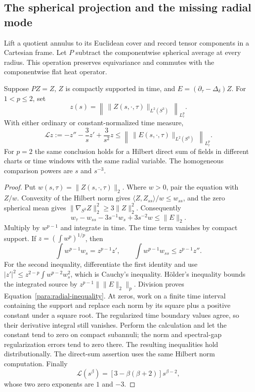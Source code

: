 \subsection{The spherical projection and the missing radial mode}
\label{para:radial-subsection}

Lift a quotient annulus to its Euclidean cover and record tensor
components in a Cartesian frame.  Let $P$ subtract the componentwise
spherical average at every radius.  This operation preserves
equivariance and commutes with the componentwise flat heat operator.

\begin{lemma}
\label{para:radial-lemma}
Suppose $PZ=Z$, $Z$ is compactly supported in time, and
$E=(\partial_\tau-\Delta_\delta)Z$.  For $1<p\le2$, set
\[
 z(s)=\left\|\,\|Z(s,\cdot,\tau)\|_{L^2(S^3)}\,\right\|_{L^p_\tau}.
\]
With either ordinary or constant-normalized time measure,
\begin{equation}
 \mathcal Lz:=-z''-\frac3s z'+\frac3{s^2}z
 \le\left\|\,\|E(s,\cdot,\tau)\|_{L^2(S^3)}\,\right\|_{L^p_\tau}.
 \label{para:radial-inequality}
\end{equation}
For $p=2$ the same conclusion holds for a Hilbert direct sum of fields
in different charts or time windows with the same radial variable.
The homogeneous comparison powers are $s$ and $s^{-3}$.
\end{lemma}

\begin{proof}
Put $w(s,\tau)=\|Z(s,\cdot,\tau)\|_2$.  Where $w>0$, pair the
equation with $Z/w$.  Convexity of the Hilbert norm gives
$\langle Z,Z_{ss}\rangle/w\le w_{ss}$, and the zero spherical
mean gives
$\|\nabla_{S^3}Z\|_2^2\ge3\|Z\|_2^2$.  Consequently
\[
 w_\tau-w_{ss}-3s^{-1}w_s+3s^{-2}w\le\|E\|_2.
\]
Multiply by $w^{p-1}$ and integrate in time.  The time term vanishes
by compact support.  If $z=(\int w^p)^{1/p}$, then
\[
 \int w^{p-1}w_s=z^{p-1}z',\qquad
 \int w^{p-1}w_{ss}\le z^{p-1}z''.
\]
For the second inequality, differentiate the first identity and use
$|z'|^2\le z^{2-p}\int w^{p-2}w_s^2$, which is Cauchy's inequality.
H\"older's inequality bounds the integrated source by
$z^{p-1}\|\|E\|_2\|_p$.  Division proves
Equation~\eqref{para:radial-inequality}.  At zeros, work on a finite
time interval containing the support and replace each norm by its
square plus a positive constant under a square root.  The regularized
time boundary values agree, so their derivative integral still
vanishes.  Perform the calculation and let the constant tend to zero
on compact subannuli; the norm and spectral-gap regularization errors
tend to zero there.  The resulting inequalities hold distributionally.
The direct-sum assertion uses the same Hilbert norm computation.
Finally
\[
 \mathcal L(s^\beta)=[3-\beta(\beta+2)]s^{\beta-2},
\]
whose two zero exponents are $1$ and $-3$.
\end{proof}

